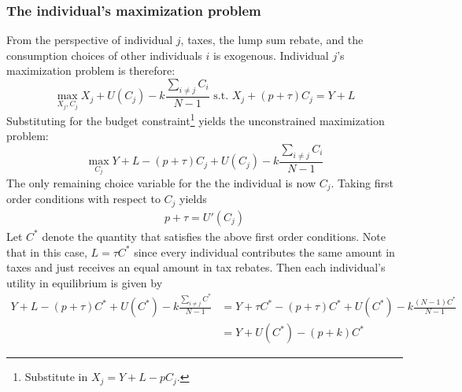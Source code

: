 \subsubsection*{The individual's maximization problem}
From the perspective of individual $j$, taxes, the lump sum rebate, and the consumption choices of other individuals $i$ is exogenous. Individual $j$'s maximization problem is therefore:
\begin{equation*}
    \max_{X_j, C_j} X_j + U(C_j) - k \frac{\sum_{i \neq j} C_i}{N - 1} \text{ s.t. } X_j + (p + \tau) C_j = Y + L
\end{equation*}
Substituting for the budget constraint\footnote{Substitute in $X_j = Y + L - p C_j$.} yields the unconstrained maximization problem: 
\begin{equation*}
    \max_{C_j} Y + L - (p + \tau) C_j + U(C_j) - k \frac{\sum_{i \neq j} C_i}{N - 1}
\end{equation*}
The only remaining choice variable for the the individual is now $C_j$. Taking first order conditions with respect to $C_j$ yields
\begin{align*}
    p + \tau = U'(C_j)
\end{align*}
Let $C^*$ denote the quantity that satisfies the above first order conditions. Note that in this case, $L = \tau C^*$ since every individual contributes the same amount in taxes and just receives an equal amount in tax rebates. Then each individual's utility in equilibrium is given by
\begin{equation*}
    \begin{split}
        Y + L - (p + \tau) C^* + U(C^*) - k \frac{\sum_{i \neq j} C^*}{N - 1} &= Y + \tau C^* - (p + \tau) C^* + U(C^*) - k \frac{(N - 1)C^*}{N - 1} \\
        &= Y + U(C^*) - (p + k) C^*
    \end{split}
\end{equation*}

